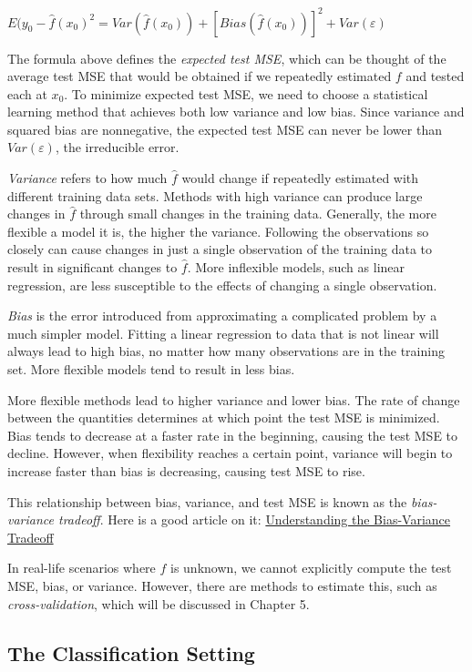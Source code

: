 \documentclass[]{book}
\begin{document}
\(E(y_0 - \hat{f}(x_0)^2 = Var(\hat{f}(x_0)) + [Bias(\hat{f}(x_0))]^2+Var(ε)\)

The formula above defines the \emph{expected test MSE}, which can be thought of the average test MSE that would be obtained if we repeatedly estimated \(f\) and tested each at \(x_0\). To minimize expected test MSE, we need to choose a statistical learning method that achieves both low variance and low bias. Since variance and squared bias are nonnegative, the expected test MSE can never be lower than \(Var(ε)\), the irreducible error.

\emph{Variance} refers to how much \(\hat{f}\) would change if repeatedly estimated with different training data sets. Methods with high variance can produce large changes in \(\hat{f}\) through small changes in the training data. Generally, the more flexible a model it is, the higher the variance. Following the observations so closely can cause changes in just a single observation of the training data to result in significant changes to \(\hat{f}\). More inflexible models, such as linear regression, are less susceptible to the effects of changing a single observation.

\emph{Bias} is the error introduced from approximating a complicated problem by a much simpler model. Fitting a linear regression to data that is not linear will always lead to high bias, no matter how many observations are in the training set. More flexible models tend to result in less bias.

More flexible methods lead to higher variance and lower bias. The rate of change between the quantities determines at which point the test MSE is minimized. Bias tends to decrease at a faster rate in the beginning, causing the test MSE to decline. However, when flexibility reaches a certain point, variance will begin to increase faster than bias is decreasing, causing test MSE to rise.

This relationship between bias, variance, and test MSE is known as the \emph{bias-variance tradeoff}. Here is a good article on it: \href{http://scott.fortmann-roe.com/docs/BiasVariance.html}{Understanding the Bias-Variance Tradeoff}

In real-life scenarios where \(f\) is unknown, we cannot explicitly compute the test MSE, bias, or variance. However, there are methods to estimate this, such as \emph{cross-validation}, which will be discussed in Chapter 5.

\hypertarget{the-classification-setting}{%
\subsection{The Classification Setting}\label{the-classification-setting}}
\end{document}
